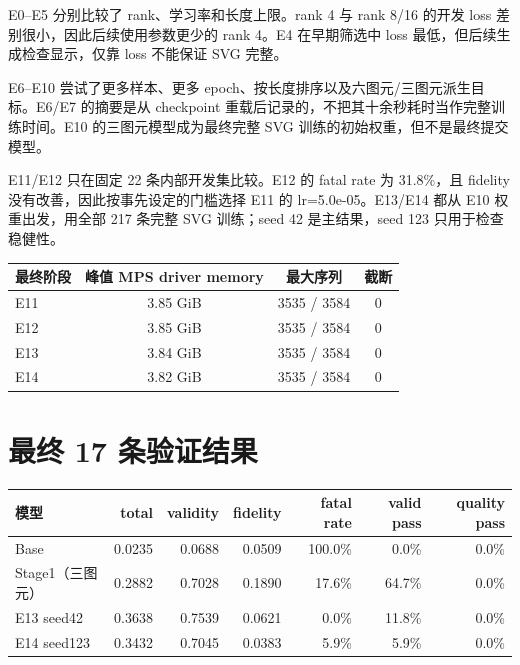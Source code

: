 \documentclass[UTF8,a4paper,zihao=5,fontset=none]{ctexart}
\newcommand{\thead}[1]{\cellcolor{accent}\color{white}\bfseries #1}
\begin{document}
E0--E5 分别比较了 rank、学习率和长度上限。rank 4 与 rank 8/16 的开发 loss 差别很小，因此后续使用参数更少的 rank 4。E4 在早期筛选中 loss 最低，但后续生成检查显示，仅靠 loss 不能保证 SVG 完整。

E6--E10 尝试了更多样本、更多 epoch、按长度排序以及六图元/三图元派生目标。E6/E7 的摘要是从 checkpoint 重载后记录的，不把其十余秒耗时当作完整训练时间。E10 的三图元模型成为最终完整 SVG 训练的初始权重，但不是最终提交模型。

E11/E12 只在固定 22 条内部开发集比较。E12 的 fatal rate 为 31.8\%，且 fidelity 没有改善，因此按事先设定的门槛选择 E11 的 lr=5.0e-05。E13/E14 都从 E10 权重出发，用全部 217 条完整 SVG 训练；seed 42 是主结果，seed 123 只用于检查稳健性。

\begin{table}[H]
\centering
\small
\begin{tabular}{lccc}
\toprule
\thead{最终阶段} & \thead{峰值 MPS driver memory} & \thead{最大序列} & \thead{截断} \\
\midrule
E11 & 3.85 GiB & 3535 / 3584 & 0 \\
\rowcolor{lightrow}E12 & 3.85 GiB & 3535 / 3584 & 0 \\
E13 & 3.84 GiB & 3535 / 3584 & 0 \\
\rowcolor{lightrow}E14 & 3.82 GiB & 3535 / 3584 & 0 \\
\bottomrule
\end{tabular}
\end{table}

\section{最终 17 条验证结果}

\begin{table}[H]
\centering
\small
\begin{tabular}{lrrrrrr}
\toprule
\thead{模型} & \thead{total} & \thead{validity} & \thead{fidelity} & \thead{fatal rate} & \thead{valid pass} & \thead{quality pass} \\
\midrule
Base & 0.0235 & 0.0688 & 0.0509 & 100.0\% & 0.0\% & 0.0\% \\
\rowcolor{lightrow}Stage1（三图元） & 0.2882 & 0.7028 & 0.1890 & 17.6\% & 64.7\% & 0.0\% \\
E13 seed42 & 0.3638 & 0.7539 & 0.0621 & 0.0\% & 11.8\% & 0.0\% \\
\rowcolor{lightrow}E14 seed123 & 0.3432 & 0.7045 & 0.0383 & 5.9\% & 5.9\% & 0.0\% \\
\bottomrule
\end{tabular}
\end{table}
\end{document}
